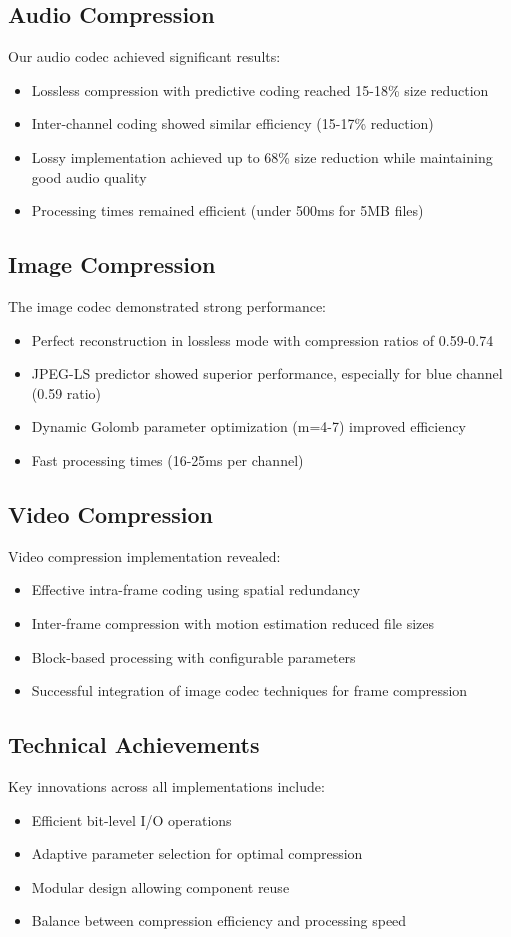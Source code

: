 \documentclass[a4paper,14pt]{article}
\begin{document}
\subsection{Audio Compression}
Our audio codec achieved significant results:
\begin{itemize}
    \item Lossless compression with predictive coding reached 15-18\% size reduction
    \item Inter-channel coding showed similar efficiency (15-17\% reduction)
    \item Lossy implementation achieved up to 68\% size reduction while maintaining good audio quality
    \item Processing times remained efficient (under 500ms for 5MB files)
\end{itemize}

\subsection{Image Compression}
The image codec demonstrated strong performance:
\begin{itemize}
    \item Perfect reconstruction in lossless mode with compression ratios of 0.59-0.74
    \item JPEG-LS predictor showed superior performance, especially for blue channel (0.59 ratio)
    \item Dynamic Golomb parameter optimization (m=4-7) improved efficiency
    \item Fast processing times (16-25ms per channel)
\end{itemize}

\subsection{Video Compression}
Video compression implementation revealed:
\begin{itemize}
    \item Effective intra-frame coding using spatial redundancy
    \item Inter-frame compression with motion estimation reduced file sizes
    \item Block-based processing with configurable parameters
    \item Successful integration of image codec techniques for frame compression
\end{itemize}

\subsection{Technical Achievements}
Key innovations across all implementations include:
\begin{itemize}
    \item Efficient bit-level I/O operations
    \item Adaptive parameter selection for optimal compression
    \item Modular design allowing component reuse
    \item Balance between compression efficiency and processing speed
\end{itemize}
\end{document}
